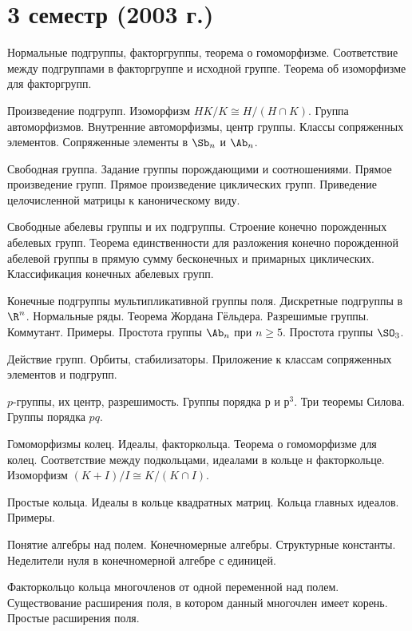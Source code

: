\documentclass[a4paper]{article}
\begin{document}
\pagebreak

\section*{3 семестр (2003 г.)}

\begin{nums}{-3.5}
\item Нормальные подгруппы, факторгруппы, теорема о гомоморфизме. Соответствие между подгруппами
в факторгруппе и исходной группе. Теорема об изоморфизме для факторгрупп.
\item Произведение подгрупп. Изоморфизм $HK/K \cong H/(H \cap K)$. Группа автоморфизмов. Внутренние автоморфизмы, центр группы.
Классы сопряженных элементов. Сопряженные элементы в $\Sb_n$ и $\Ab_n$.
\item Свободная группа. Задание группы порождающими и соотношениями. Прямое произведение групп.
Прямое произведение циклических групп. Приведение целочисленной матрицы к каноническому виду.
\item Свободные абелевы группы и их подгруппы. Строение конечно порожденных абелевых
групп. Теорема единственности для разложения конечно порожденной  абелевой группы в
прямую сумму бесконечных и примарных циклических. Классификация конечных
абелевых групп.
\item Конечные подгруппы мультипликативной группы поля. Дискретные подгруппы в $\R^n$. Нормальные ряды. Теорема Жордана Гёльдера. Разрешимые группы. Коммутант. Примеры.
Простота группы $\Ab_n$ при $n \ge 5$. Простота группы $\SO_3$.
\item Действие групп. Орбиты, стабилизаторы. Приложение к классам сопряженных элементов
и подгрупп.
\item $p$-группы, их центр, разрешимость. Группы порядка $р$ и $р^3$. Три теоремы Силова. Группы порядка $pq$.
\item Гомоморфизмы колец. Идеалы, факторкольца. Теорема о гомоморфизме для колец.
Соответствие между подкольцами, идеалами в кольце н факторкольце. Изоморфизм
$(K + I)/I \cong K/(K \cap I)$.
\item Простые кольца. Идеалы в кольце квадратных матриц. Кольца главных идеалов. Примеры.
\item Понятие алгебры над полем. Конечномерные алгебры. Структурные константы. Неделители
нуля в конечномерной алгебре с единицей.
\item Факторкольцо кольца многочленов от одной переменной над полем. Существование
расширения поля, в котором данный многочлен имеет корень. Простые расширения поля.

\end{nums}
\end{document}
